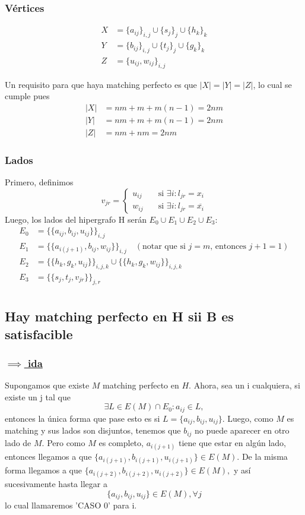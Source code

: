 \documentclass[11pt, a4paper]{article}
\theoremstyle{definition}
\begin{document}
\subsubsection*{Vértices}
\begin{align*}
	X & = \{a_{ij}\}_{i,j} \cup \{s_j\}_j \cup \{h_k\}_k \\
	Y & = \{b_{ij}\}_{i,j} \cup \{t_j\}_j \cup \{g_k\}_k \\
	Z & = \{u_{ij}, w_{ij}\}_{i,j}
\end{align*}

Un requisito para que haya matching perfecto es que \(|X| = |Y| = |Z|\), lo cual se cumple pues
\begin{align*}
	|X| & = nm + m + m(n-1) = 2nm \\
	|Y| & = nm + m + m(n-1) = 2nm \\
	|Z| & = nm + nm = 2nm
\end{align*}

\subsubsection*{Lados}
Primero, definimos
\[
v_{jr} = \begin{cases}
          u_{ij} & \quad\text{si } \exists i : l_{jr} = x_i \\	
          w_{ij} & \quad\text{si } \exists i : l_{jr} = \overline{x_i}
\end{cases}
\]
Luego, los lados del hipergrafo H serán \(E_0 \cup E_1 \cup E_2 \cup E_3\):
\begin{align*}
	E_0 & = \{\{a_{ij}, b_{ij}, u_{ij}\}\}_{i,j} \\
	E_1 & = \{\{a_{i(j+1)}, b_{ij}, w_{ij}\}\}_{i,j} \quad(\text{notar que si } j = m \text{, entonces } j+1 = 1) \\
	E_2 & = \{\{h_k, g_k, u_{ij}\}\}_{i,j,k} \cup \{\{h_k, g_k, w_{ij}\}\}_{i,j,k}\\
  E_3 & = \{\{s_j, t_j, v_{jr}\}\}_{j,r} \\
\end{align*}

\subsection*{Hay matching perfecto en H sii B es satisfacible}
\subsubsection*{\underline{\(\implies\) ida}}
Supongamos que existe \(M\) matching perfecto en \(H\). Ahora, sea un i cualquiera, si existe un j tal que
      \[\exists L \in E(M) \cap E_0 : a_{ij} \in L, \]
entonces la única forma que pase esto es si \({ L = \{a_{ij}, b_{ij}, u_{ij}\}. }\) Luego, como \(M\) es matching y sus lados son disjuntos, tenemos que \(b_{ij}\) no puede aparecer en otro lado de \(M\). Pero como \(M\) es completo, \(a_{i(j+1)}\) tiene que estar en algún lado, entonces llegamos a que \({ \{a_{i(j+1)}, b_{i(j+1)}, u_{i(j+1)} \} \in E(M) .}\) De la misma forma llegamos a que \({ \{a_{i(j+2)}, b_{i(j+2)}, u_{i(j+2)} \} \in E(M) ,}\) y así sucesivamente hasta llegar a
      \[ \{a_{ij}, b_{ij}, u_{ij}\} \in E(M), \forall j \]
lo cual llamaremos 'CASO 0' para i.
\end{document}
